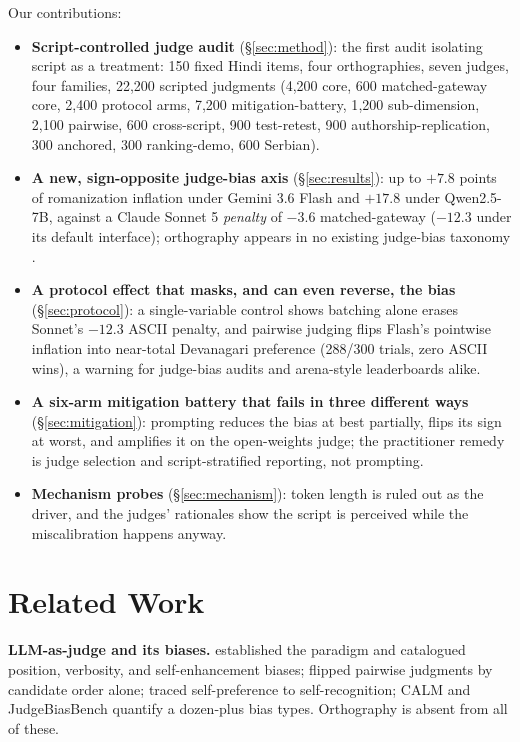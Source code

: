 Our contributions:
\begin{itemize}
  \item \textbf{Script-controlled judge audit} (\S\ref{sec:method}): the first audit isolating script as a treatment: 150 fixed Hindi items, four orthographies, seven judges, four families, 22{,}200 scripted judgments (4{,}200 core, 600 matched-gateway core, 2{,}400 protocol arms, 7{,}200 mitigation-battery, 1{,}200 sub-dimension, 2{,}100 pairwise, 600 cross-script, 900 test-retest, 900 authorship-replication, 300 anchored, 300 ranking-demo, 600 Serbian).
  \item \textbf{A new, sign-opposite judge-bias axis} (\S\ref{sec:results}): up to $+7.8$ points of romanization inflation under Gemini 3.6 Flash and $+17.8$ under Qwen2.5-7B, against a Claude Sonnet 5 \emph{penalty} of $-3.6$ matched-gateway ($-12.3$ under its default interface); orthography appears in no existing judge-bias taxonomy \citep{ye2024justice, zhou2026judgebiasbench}.
  \item \textbf{A protocol effect that masks, and can even reverse, the bias} (\S\ref{sec:protocol}): a single-variable control shows batching alone erases Sonnet's $-12.3$ ASCII penalty, and pairwise judging flips Flash's pointwise inflation into near-total Devanagari preference (288/300 trials, zero ASCII wins), a warning for judge-bias audits and arena-style leaderboards alike.
  \item \textbf{A six-arm mitigation battery that fails in three different ways} (\S\ref{sec:mitigation}): prompting reduces the bias at best partially, flips its sign at worst, and amplifies it on the open-weights judge; the practitioner remedy is judge selection and script-stratified reporting, not prompting.
  \item \textbf{Mechanism probes} (\S\ref{sec:mechanism}): token length is ruled out as the driver, and the judges' rationales show the script is perceived while the miscalibration happens anyway.
\end{itemize}

\section{Related Work}
\label{sec:related}

\textbf{LLM-as-judge and its biases.} \citet{zheng2023judging} established the paradigm and catalogued position, verbosity, and self-enhancement biases; \citet{wang2023fair} flipped pairwise judgments by candidate order alone; \citet{panickssery2024self} traced self-preference to self-recognition; CALM \citep{ye2024justice} and JudgeBiasBench \citep{zhou2026judgebiasbench} quantify a dozen-plus bias types. Orthography is absent from all of these.

